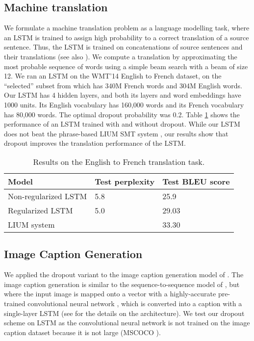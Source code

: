 \documentclass{article}
\begin{document}
\subsection{Machine translation}
\label{sec:trans}

We formulate a machine translation problem as a language modelling task, where
an LSTM is trained to assign high probability to a correct
translation of a source sentence.  Thus, the LSTM is trained on
concatenations of source sentences and their translations 
\cite{sutskever2014sequence} (see also \cite{cho2014learning}). We compute a translation by 
approximating the most probable sequence of words
using a simple beam search with a beam of size 12.  We ran an
LSTM on the WMT'14 English to French dataset, on the
``selected'' subset from \citet{wmt_joint} which has 340M French words
and 304M English words.  Our LSTM has 4 hidden layers, and both its
layers and word embeddings have 1000 units.  Its 
English vocabulary has 160,000 words and its French vocabulary has
80,000 words.  The optimal dropout probability was 0.2.
Table \ref{tab:mt} shows the performance of an LSTM trained with and without dropout.
While our LSTM does not beat the phrase-based LIUM SMT system
\cite{lium}, our results show that dropout improves the
translation performance of the LSTM.

\begin{table}[t]
  \small
  \centering
  \renewcommand{\arraystretch}{1.15}
  \begin{tabular}{lll}
    \hline
     Model & Test perplexity & Test BLEU score \\
    \hline
    Non-regularized LSTM & 5.8 & 25.9 \\
    Regularized LSTM & 5.0 &  29.03 \\
    \hline
    LIUM system  &  &  33.30 \\
    \hline
  \end{tabular}
  \caption{Results on the English to French translation task. }
  \label{tab:mt}
\end{table}

\subsection{Image Caption Generation}

We applied the dropout variant 
to the image caption generation model of \cite{vinyals2014show}.  The 
image caption generation is similar to the sequence-to-sequence model
of \cite{sutskever2014sequence}, but where the input image is mapped
onto a vector with a highly-accurate pre-trained convolutional
neural network \citep{szegedy2014going}, which is converted
into a caption with a single-layer LSTM (see \citet{vinyals2014show}
for the details on the architecture).  We test our dropout scheme on  
LSTM as the convolutional neural network is not trained on the image caption
dataset because it is not large (MSCOCO \citep{coco}). 
\end{document}
